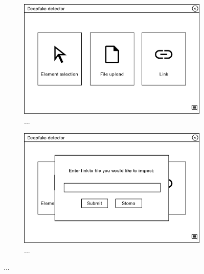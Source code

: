 \begin{figure}[H]
    \begin{subfigure}[h]{.5\linewidth}
        \centering
        \includegraphics[width=1\linewidth]{other-fig/client_wireframe_input_selection.png}
        \caption{...}
    \end{subfigure}
    \hfill
    \begin{subfigure}[h]{.475\linewidth}
        \centering
        \includegraphics[width=1\linewidth]{other-fig/client_wireframe_input_selection2.png}
        \caption{...}
    \end{subfigure}
    \caption{...}
    \label{fig:xxx}
\end{figure}

